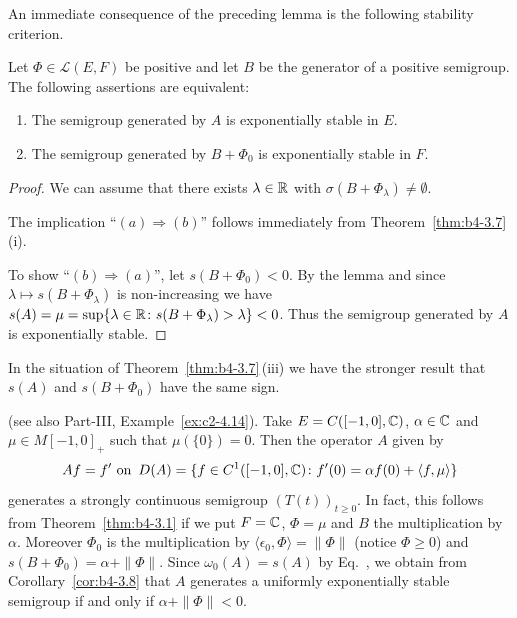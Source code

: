 An immediate consequence of the preceding lemma is the following stability criterion.
\begin{corollary}\label{cor:b4-3.8}
Let $\Phi \in \mathcal{L}(E,F)$ be positive and let $B$ be the generator of a positive semigroup. 
The following assertions are equivalent:
\begin{enumerate}[\upshape (a)]
	\item 
    The semigroup generated by $A$ is exponentially stable in $E$.
	
    \item 
    The semigroup generated by $B + \Phi_{0}$ is exponentially stable in $F$.
\end{enumerate}
\end{corollary}
\begin{proof}
We can assume that there exists $\lambda \in \mathbb{R}$ with $\sigma(B+\Phi_{\lambda}) \neq \emptyset$.

The implication \enquote{$(a)\Rightarrow(b)$} follows immediately from Theorem~\ref{thm:b4-3.7}\,(i).

To show \enquote{$(b)\Rightarrow(a)$}, let $s(B+\Phi_{0}) < 0$. 
By the lemma and since $\lambda \mapsto s(B+\Phi_{\lambda})$ is non-increasing we have $s(A) = \mu = \sup\{\lambda \in \mathbb{R} \colon s(B+\Phi_{\lambda}) > \lambda\} < 0$. 
Thus the semigroup generated by $A$ is exponentially stable.
\end{proof}
\begin{remark*}
In the situation of Theorem~\ref{thm:b4-3.7}\,(iii) we have the stronger result that $s(A)$ and $s(B + \Phi_{0})$ have the same sign.
\end{remark*}
\begin{example}\label{ex:b4-3.9}
(see also Part-III, Example~\ref{ex:c2-4.14}). Take $E = C([-1,0],\mathbb{C})$, $\alpha \in \mathbb{C}$ and $\mu \in M[-1,0]_{+}$ such that $\mu(\{0\}) = 0$. 
Then the operator $A$ given by 
\[Af = f'
 \text{ on \,} 
D(A) = \{f \in C^1([-1,0],\mathbb{C}) \colon f'(0) = \alpha f(0) + \langle f,\mu\rangle\}
\]
 generates a strongly continuous semigroup $(T(t))_{t\geq0}$. 
In fact, this follows from Theorem~\ref{thm:b4-3.1} if we put $F = \mathbb{C}$, $\Phi = \mu$ and $B$ the multiplication by $\alpha$. 
Moreover $\Phi_{0}$ is the multiplication by $ \langle \epsilon_{0}, \Phi  \rangle = \|\Phi\|$ (notice 
$\Phi\geq 0$) and $s(B + \Phi_{0}) = \alpha + \|\Phi\|$. 
Since $\omega_{0}(A) = s(A)$ by Eq.~, we obtain from Corollary~\ref{cor:b4-3.8} that $A$ generates a uniformly exponentially stable semigroup if and only if\/ $\alpha + \|\Phi\| < 0$.
\end{example}
